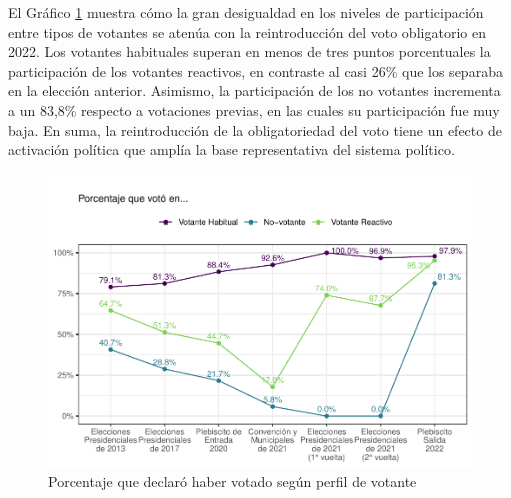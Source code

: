 \documentclass[
  12pt,
]{book}
\begin{document}
El Gráfico \ref{fig:graf-tipo-participacion} muestra cómo la gran desigualdad en los niveles de participación entre tipos de votantes se atenúa con la reintroducción del voto obligatorio en 2022. Los votantes habituales superan en menos de tres puntos porcentuales la participación de los votantes reactivos, en contraste al casi 26\% que los separaba en la elección anterior. Asimismo, la participación de los no votantes incrementa a un 83,8\% respecto a votaciones previas, en las cuales su participación fue muy baja. En suma, la reintroducción de la obligatoriedad del voto tiene un efecto de activación política que amplía la base representativa del sistema político.

\begin{figure}

{\centering \includegraphics{reporte-elsoc_files/figure-latex/graf-tipo-participacion-1} 

}

\caption{Porcentaje que declaró haber votado según perfil de votante}\label{fig:graf-tipo-participacion}
\end{figure}
\end{document}
